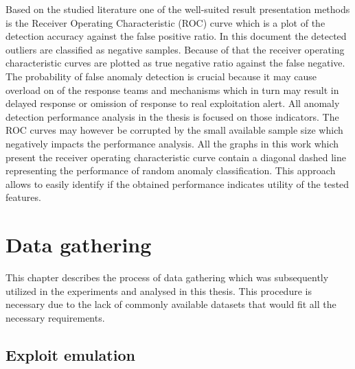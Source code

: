 \documentclass[a4paper,twoside,12pt]{book}
\begin{document}
Based on the studied literature one of the well-suited result presentation methods is the Receiver 
Operating Characteristic (ROC) curve which is a plot of the detection accuracy against the false 
positive ratio. In this document the detected outliers are classified as negative samples. Because 
of that the receiver operating characteristic curves are plotted as true negative ratio against the 
false negative. The probability of false anomaly detection is crucial because it may cause overload
on of the response teams and mechanisms which in turn may result in delayed response or omission
of response to real exploitation alert. All anomaly detection performance analysis in the thesis is focused
on those indicators. The ROC curves may however be corrupted by the small available sample size 
which negatively impacts the performance analysis. All the graphs in this work which present
the receiver operating characteristic curve contain a diagonal dashed line representing the
performance of random anomaly classification. This approach allows to easily identify if the obtained
performance indicates utility of the tested features.


\chapter{Data gathering}
This chapter describes the process of data gathering which was subsequently utilized in the experiments and 
analysed in this thesis. This procedure is necessary due to the lack of commonly available 
datasets that would fit all the necessary requirements. 

\section{Exploit emulation}
\end{document}
